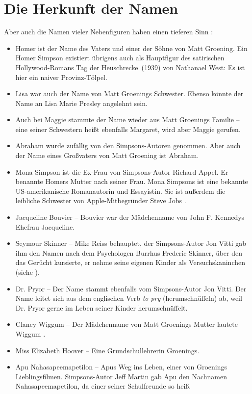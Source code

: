 \section{Die Herkunft der Namen}\label{HerkunftNamen}
Aber auch die Namen vieler Nebenfiguren haben einen tieferen Sinn \cite{Wikipedia}:
\begin{itemize}
  \item Homer ist der Name des Vaters und einer der Söhne von Matt Groening. Ein Homer Simpson existiert übrigens auch als Hauptfigur des satirischen Hollywood-Romans \glqq Tag der Heuschrecke\grqq\ (1939) von Nathanael West: Es ist hier ein naiver Provinz-Tölpel.
  \item Lisa war auch der Name von Matt Groenings Schwester. Ebenso könnte der Name an Lisa Marie Presley angelehnt sein.
  \item Auch bei Maggie stammte der Name wieder aus Matt Groenings Familie -- eine seiner Schwestern heißt ebenfalls Margaret, wird aber Maggie gerufen.
  \item Abraham wurde zufällig von den Simpsons-Autoren genommen. Aber auch der Name eines Großvaters von Matt Groening ist Abraham.
  \item Mona Simpson ist die Ex-Frau von Simpsons-Autor Richard Appel. Er benannte Homers Mutter nach seiner Frau. Mona Simpsons ist eine bekannte US-amerikanische Romanautorin und Essayistin. Sie ist außerdem die leibliche Schwester von Apple-Mitbegründer Steve Jobs \cite{Burciu10}.
  \item Jacqueline Bouvier -- Bouvier war der Mädchenname von John F. Kennedys Ehefrau Jacqueline.
  \item Seymour Skinner -- Mike Reiss behauptet, der Simpsons-Autor Jon Vitti gab ihm den Namen nach dem Psychologen Burrhus Frederic Skinner, über den das Gerücht kursierte, er nehme seine eigenen Kinder als Versuchskaninchen (siehe \cite{Reiss19}).
  \item Dr. Pryor -- Der Name stammt ebenfalls vom Simpsons-Autor Jon Vitti. Der Name leitet sich aus dem englischen Verb \emph{to pry} (herumschnüffeln) ab, weil Dr. Pryor gerne im Leben seiner Kinder herumschnüffelt.
  \item Clancy Wiggum -- Der Mädchenname von Matt Groenings Mutter lautete Wiggum \cite{Vincent2013}.
  \item Miss Elizabeth Hoover -- Eine Grundschullehrerin Groenings.
  \item Apu Nahasapeemapetilon -- Apus Weg ins Leben, einer von Groenings Lieblingsfilmen. Simpsons-Autor Jeff Martin gab Apu den Nachnamen \glqq Nahasapeemapetilon\grqq , da einer seiner Schulfreunde so heiß.

\end{itemize}
